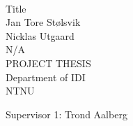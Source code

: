 \thispagestyle{empty}
\mbox{}\\[6pc]
\begin{center}
	\Huge{Title}\\[2pc]
	
	\Large{Jan Tore Stølsvik}\\[1pc]
	\Large{Nicklas Utgaard}\\[1pc]
	\Large{N/A}\\[2pc]
	
	PROJECT THESIS\\
	Department of IDI\\
	NTNU
\end{center}
\vfill

\noindent Supervisor 1: Trond Aalberg

